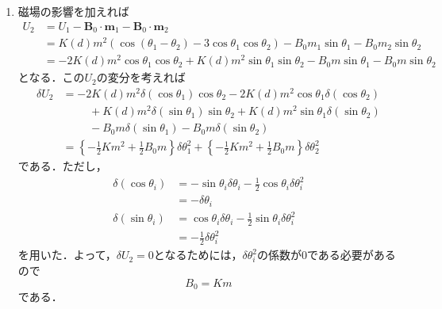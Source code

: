 \documentclass[a4paper,pdflatex,ja=standard]{bxjsarticle}
\begin{document}
\begin{enumerate}
  \item 
  磁場の影響を加えれば
  \begin{align}
    U_{2}
    &=
    U_{1}-\bm{B}_{0}\cdot\bm{m}_{1}-\bm{B}_{0}\cdot\bm{m}_{2}
    \nonumber
    \\
    &=
    K(d)m^2
    \left(
    \cos(\theta_{1}-\theta_{2})
    -
    3\cos\theta_{1}\cos\theta_{2}
    \right)
    -B_{0}m_{1}\sin\theta_{1}
    -B_{0}m_{2}\sin\theta_{2}
    \nonumber
    \\
    &=
    -2K(d)m^2
    \cos\theta_{1}\cos\theta_{2}
    +
    K(d)m^2\sin\theta_{1}\sin\theta_{2}
    -
    B_{0}m\sin\theta_{1}
    -
    B_{0}m\sin\theta_{2}
  \end{align}
  となる．この$U_{2}$の変分を考えれば
  \begin{align}
    \delta U_{2}
    &=
    -2K(d)m^2
    \delta(\cos\theta_{1})\cos\theta_{2}
    -2K(d)m^2
    \cos\theta_{1}\delta(\cos\theta_{2})
    \nonumber
    \\
    &\hspace{1cm}
    +
    K(d)m^2\delta(\sin\theta_{1})\sin\theta_{2}
    +
    K(d)m^2\sin\theta_{1}\delta(\sin\theta_{2})
    \nonumber
    \\
    &\hspace{1cm}    
    -
    B_{0}m\delta(\sin\theta_{1})
    -
    B_{0}m\delta(\sin\theta_{2})    
    \nonumber
    \\
    &=
    \left\{ -\frac{1}{2}Km^2 + \frac{1}{2}B_{0}m \right\}\delta \theta_{1}^2
    +
    \left\{ -\frac{1}{2}Km^2 + \frac{1}{2}B_{0}m  \right\}\delta \theta_{2}^2
  \end{align}
  である．ただし，
  \begin{align}
    \delta (\cos\theta_{i})
    &=
    -\sin\theta_{i}\delta\theta_{i}
    -\frac{1}{2}\cos\theta_{i}\delta\theta_{i}^2
    \nonumber
    \\
    &=
    -\delta\theta_{i}
    \\
    \delta (\sin\theta_{i})
    &=
    \cos\theta_{i}\delta\theta_{i}
    -
    \frac{1}{2}\sin\theta_{i}\delta\theta_{i}^2
    \nonumber
    \\
    &=
    -\frac{1}{2}\delta \theta_{i}^2
  \end{align}
  を用いた．よって，$\delta U_{2}=0$となるためには，$\delta\theta_{i}^2$の係数が$0$である必要があるので
  \begin{equation}
    B_{0}
    =
    Km
  \end{equation}
  である．

\end{enumerate}
\end{document}
